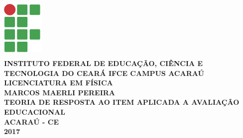 	\pagestyle{empty}
	\begin{titlepage}
		\begin{center}
			\includegraphics[width=2cm,height=3cm]{img/if}\\
			\textbf{INSTITUTO FEDERAL DE EDUCAÇÃO, CIÊNCIA E TECNOLOGIA DO CEARÁ IFCE CAMPUS ACARAÚ}
				\textbf{LICENCIATURA EM FÍSICA}\\
				\vspace{3cm}
				\textbf{MARCOS MAERLI PEREIRA}\\
				\vspace{4cm}
				\textbf{TEORIA DE RESPOSTA AO ITEM APLICADA A AVALIAÇÃO EDUCACIONAL}\\
				\vspace{6cm}
				\textbf{ACARAÚ - CE\\2017}
		\end{center}
	\end{titlepage}
		\newpage